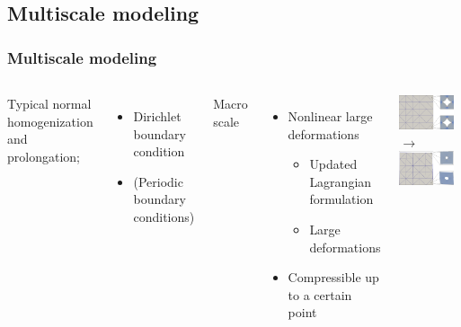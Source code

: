 \documentclass[11pt,mathserif]{beamer}
\begin{document}
\subsection{Multiscale modeling}
\begin{frame}
 \frametitle{Multiscale modeling}
\begin{columns}
Typical normal homogenization and prolongation;
 \begin{itemize}
  \item Dirichlet boundary condition
  \item (Periodic boundary conditions)
 \end{itemize}

 Macro scale
 \begin{itemize}
  \item Nonlinear large deformations
  \begin{itemize}
   \item Updated Lagrangian formulation
   \item Large deformations
  \end{itemize}
  \item Compressible up to a certain point
 \end{itemize}


\begin{center}
 \includegraphics[width=0.9\textwidth]{figures/Sintering_5x5_000.png}\\
 $\longrightarrow$\\[0.5em]
 \includegraphics[width=0.9\textwidth]{figures/Sintering_5x5_114.png}
\end{center}
\end{columns}
\end{frame}
\end{document}
